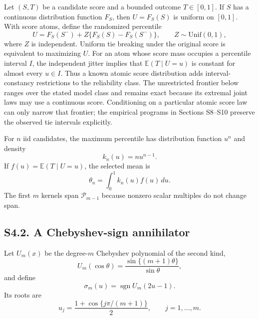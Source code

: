 \documentclass[10pt,twocolumn]{article}
\newcommand{\E}{\mathbb{E}}
\newcommand{\cP}{\mathcal P}
\newcommand{\sgn}{\operatorname{sgn}}
\begin{document}
Let $(S,T)$ be a candidate score and a bounded outcome $T\in[0,1]$. If $S$ has a continuous distribution function $F_S$, then $U=F_S(S)$ is uniform on $[0,1]$. With score atoms, define the randomized percentile
\begin{equation}
U=F_S(S^-)+Z\{F_S(S)-F_S(S^-)\},
\qquad Z\sim\mathrm{Unif}(0,1),
\label{si:eq:randomized-percentile}
\end{equation}
where $Z$ is independent. Uniform tie breaking under the original score is equivalent to maximizing $U$.
For an atom whose score mass occupies a percentile interval $I$, the independent
jitter implies that $\E(T\mid U=u)$ is constant for almost every $u\in I$.
Thus a known atomic score distribution adds interval-constancy restrictions to
the reliability class. The unrestricted frontier below ranges over the stated
model class and remains exact because its extremal joint laws may use a
continuous score. Conditioning on a particular atomic score law can only
narrow that frontier; the empirical programs in Sections S8--S10 preserve the
observed tie intervals explicitly.

For $n$ iid candidates, the maximum percentile has distribution function $u^n$ and density
\begin{equation}
k_n(u)=nu^{n-1}.
\label{si:eq:winner-kernel}
\end{equation}
If $f(u)=\E(T\mid U=u)$, the selected mean is
\begin{equation}
\theta_n=\int_0^1k_n(u)f(u)\,du.
\label{si:eq:selected-mean}
\end{equation}
The first $m$ kernels span $\cP_{m-1}$ because nonzero scalar multiples do not change span.

\subsection*{S4.2. A Chebyshev-sign annihilator}

Let $U_m(x)$ be the degree-$m$ Chebyshev polynomial of the second kind,
\begin{equation}
U_m(\cos\theta)=\frac{\sin\{(m+1)\theta\}}{\sin\theta},
\label{si:eq:cheby-definition}
\end{equation}
and define
\begin{equation}
\sigma_m(u)=\sgn U_m(2u-1).
\label{si:eq:sigma}
\end{equation}
Its roots are
\begin{equation}
u_j=\frac{1+\cos\{j\pi/(m+1)\}}2,
\qquad j=1,\ldots,m.
\label{si:eq:nodes}
\end{equation}
\end{document}
